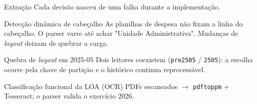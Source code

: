 \documentclass[aspectratio=169]{beamer}
\begin{document}
\begin{frame}{Extração}
  \footnotesize Cada decisão nasceu de uma falha durante a implementação.
  \vspace{0.2cm}
  \begin{block}{Detecção dinâmica de cabeçalho}
    \small As planilhas de despesa não fixam a linha do cabeçalho. O parser varre até achar "Unidade Administrativa". Mudanças de \textit{layout} deixam de quebrar a carga.
  \end{block}
  \begin{block}{Quebra de \textit{layout} em 2025-05}
    \small Dois leitores coexistem (\texttt{pre2505} / \texttt{2505}): a escolha ocorre pela chave de partição e o histórico continua reprocessável.
  \end{block}
  \begin{block}{Classificação funcional da LOA (OCR)}
    \small PDFs escaneados $\rightarrow$ \texttt{pdftoppm} + Tesseract; o parser valida o exercício 2026.
  \end{block}
\end{frame}
\end{document}
